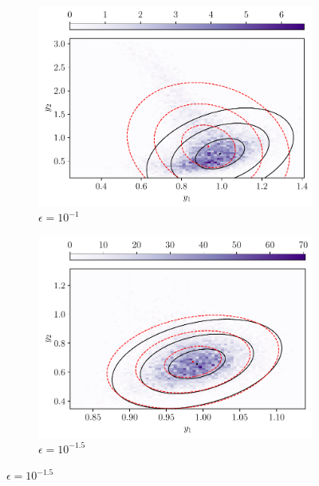 \begin{figure}
	\begin{center}
		\begin{subfigure}{0.49\textwidth}
			\includegraphics[width=\textwidth]{chp04_paper_numerics/figures/rossby/hist_0.1.pdf}
			\caption{\(\epsilon = 10^{-1}\)}
			\label{fig:y_hists_a}
		\end{subfigure}
		\begin{subfigure}{0.49\textwidth}
			\includegraphics[width=\textwidth]{chp04_paper_numerics/figures/rossby/hist_0.03162277660168379.pdf}
			\caption{\(\epsilon = 10^{-1.5}\)}
			\label{fig:y_hists_b}
		\end{subfigure}

\end{center}
\end{figure}
